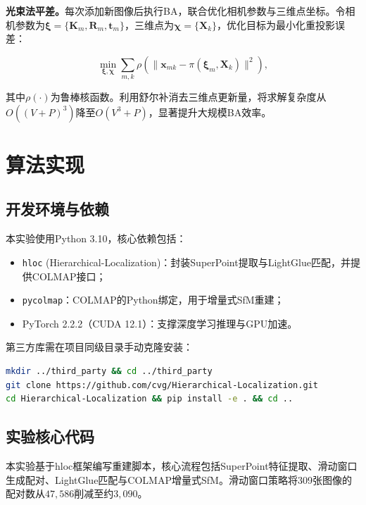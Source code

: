 \documentclass[UTF8,a4paper]{ctexart}
\begin{document}
\textbf{光束法平差。}每次添加新图像后执行BA，联合优化相机参数与三维点坐标。令相机参数为$\boldsymbol{\xi} = \{\boldsymbol{K}_m, \boldsymbol{R}_m, \boldsymbol{t}_m\}$，三维点为$\boldsymbol{\chi} = \{\boldsymbol{X}_k\}$，优化目标为最小化重投影误差：

$$\min_{\boldsymbol{\xi}, \boldsymbol{\chi}} \sum_{m,k} \rho\left(\|\boldsymbol{x}_{mk} - \pi(\boldsymbol{\xi}_m, \boldsymbol{X}_k)\|^2\right),$$

其中$\rho(\cdot)$为鲁棒核函数。利用舒尔补消去三维点更新量，将求解复杂度从$O((V+P)^3)$降至$O(V^3 + P)$，显著提升大规模BA效率。

\section{算法实现}

\subsection{开发环境与依赖}

本实验使用Python 3.10，核心依赖包括：
\begin{itemize}
    \item \texttt{hloc} (Hierarchical-Localization)：封装SuperPoint提取与LightGlue匹配，并提供COLMAP接口；
    \item \texttt{pycolmap}：COLMAP的Python绑定，用于增量式SfM重建；
    \item PyTorch 2.2.2（CUDA 12.1）：支撑深度学习推理与GPU加速。
\end{itemize}

第三方库需在项目同级目录手动克隆安装：

\begin{lstlisting}[language=bash]
mkdir ../third_party && cd ../third_party
git clone https://github.com/cvg/Hierarchical-Localization.git
cd Hierarchical-Localization && pip install -e . && cd ..
\end{lstlisting}

\subsection{实验核心代码}

本实验基于hloc框架编写重建脚本，核心流程包括SuperPoint特征提取、滑动窗口生成配对、LightGlue匹配与COLMAP增量式SfM。滑动窗口策略将309张图像的配对数从$47,586$削减至约$3,090$。
\end{document}
